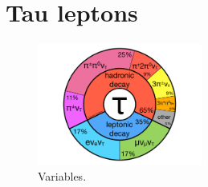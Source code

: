 \chapter[taus][taus]{Tau leptons}

\begin{figure}[tp]
  \centering
  \includegraphics[width=0.48\textwidth]{figures/piecharts/taudecay}
  \caption{Variables.}
  \label{fig:taus-decaypie}
\end{figure}


